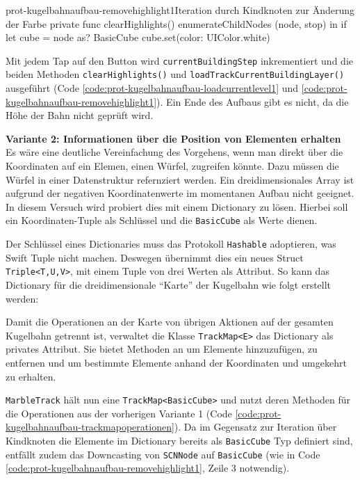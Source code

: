 \begin{description}
	\begin{code}{prot-kugelbahnaufbau-removehighlight1}{Iteration durch Kindknoten zur Änderung der Farbe}
		private func clearHighlights() {
			enumerateChildNodes { (node, stop) in
				if let cube = node as? BasicCube {
					cube.set(color: UIColor.white)
				}
			}
		}
	\end{code}

	Mit jedem Tap auf den Button wird \texttt{currentBuildingStep} inkrementiert und die beiden Methoden \texttt{clearHighlights()} und \texttt{loadTrackCurrentBuildingLayer()} ausgeführt (Code \ref{code:prot-kugelbahnaufbau-loadcurrentlevel1} und \ref{code:prot-kugelbahnaufbau-removehighlight1}). Ein Ende des Aufbaus gibt es nicht, da die Höhe der Bahn nicht geprüft wird.

	\textbf{Variante 2: Informationen über die Position von Elementen erhalten}\\
	Es wäre eine deutliche Vereinfachung des Vorgehens, wenn man direkt über die Koordinaten auf ein Elemen, einen Würfel, zugreifen könnte. Dazu müssen die Würfel in einer Datenstruktur refernziert werden. Ein dreidimensionales Array ist aufgrund der negativen Koordinatenwerte im momentanen Aufbau nicht geeignet. In diesem Versuch wird probiert dies mit einem Dictionary zu lösen. Hierbei soll ein Koordinaten-Tuple als Schlüssel und die \texttt{BasicCube} als Werte dienen.
	
	Der Schlüssel eines Dictionaries muss das Protokoll \texttt{Hashable} adoptieren, was Swift Tuple nicht machen. Deswegen übernimmt dies ein neues Struct \texttt{Triple<T,U,V>}, mit einem Tuple von drei Werten als Attribut. So kann das Dictionary für die dreidimensionale "`Karte"' der Kugelbahn wie folgt erstellt werden:

	Damit die Operationen an der Karte von übrigen Aktionen auf der gesamten Kugelbahn getrennt ist, verwaltet die Klasse \texttt{TrackMap<E>} das Dictionary als privates Attribut. Sie bietet Methoden an um Elemente hinzuzufügen, zu entfernen und um bestimmte Elemente anhand der Koordinaten und umgekehrt zu erhalten.

	\texttt{MarbleTrack} hält nun eine \texttt{TrackMap<BasicCube>} und nutzt deren Methoden für die Operationen aus der vorherigen Variante 1 (Code \ref{code:prot-kugelbahnaufbau-trackmapoperationen}). Da im Gegensatz zur Iteration über Kindknoten die Elemente im Dictionary bereits als \texttt{BasicCube} Typ definiert sind, entfällt zudem das Downcasting von \texttt{SCNNode} auf \texttt{BasicCube} (wie in Code \ref{code:prot-kugelbahnaufbau-removehighlight1}, Zeile 3 notwendig).


\end{description}
